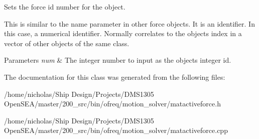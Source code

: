 Sets the force id number for the object. 

This is similar to the name parameter in other force objects. It is an identifier. In this case, a numerical identifier. Normally correlates to the objects index in a vector of other objects of the same class. 
\begin{DoxyParams}{Parameters}
{\em num} & The integer number to input as the objects integer id. \\
\hline
\end{DoxyParams}


The documentation for this class was generated from the following files\-:\begin{DoxyCompactItemize}
\item 
/home/nicholas/\-Ship Design/\-Projects/\-D\-M\-S1305 Open\-S\-E\-A/master/200\-\_\-src/bin/ofreq/motion\-\_\-solver/matactiveforce.\-h\item 
/home/nicholas/\-Ship Design/\-Projects/\-D\-M\-S1305 Open\-S\-E\-A/master/200\-\_\-src/bin/ofreq/motion\-\_\-solver/matactiveforce.\-cpp\end{DoxyCompactItemize}
